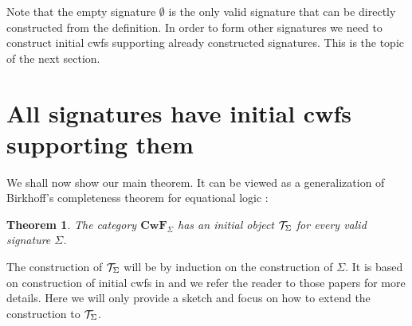 \documentclass{lmcs}
\newtheorem{theorem}{Theorem}
\def\Cwf{\mathbf{CwF}}
\begin{document}
Note that the empty signature $\emptyset$ is the only valid signature that can be directly constructed from the definition. In order to form other signatures we need to construct initial cwfs supporting already constructed signatures. This is the topic of the next section.

\section{All signatures have initial cwfs supporting them}

We shall now show our main theorem. It can be viewed as a generalization of Birkhoff's completeness theorem for equational logic \cite{birkhoff}:
\begin{theorem}
The category $\Cwf_\Sigma$ has an initial object ${\mathcal T}_\Sigma$ for every valid signature $\Sigma$.
\end{theorem}

The construction of ${\mathcal T}_\Sigma$ will be by induction on the construction of $\Sigma$. It is based on construction of initial cwfs in \cite{castellan:tlca2015,castellan:lmcs} and we refer the reader to those papers for more details. Here we will only provide a sketch and focus on how to extend the construction to ${\mathcal T}_\Sigma$.
\end{document}
